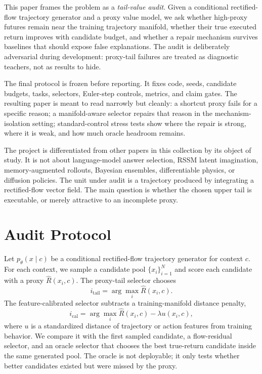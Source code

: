 \documentclass[10pt]{article}
\begin{document}
This paper frames the problem as a \emph{tail-value audit}. Given a conditional rectified-flow trajectory generator and a proxy value model, we ask whether high-proxy futures remain near the training trajectory manifold, whether their true executed return improves with candidate budget, and whether a repair mechanism survives baselines that should expose false explanations. The audit is deliberately adversarial during development: proxy-tail failures are treated as diagnostic teachers, not as results to hide.

The final protocol is frozen before reporting. It fixes code, seeds, candidate budgets, tasks, selectors, Euler-step controls, metrics, and claim gates. The resulting paper is meant to read narrowly but cleanly: a shortcut proxy fails for a specific reason; a manifold-aware selector repairs that reason in the mechanism-isolation setting; standard-control stress tests show where the repair is strong, where it is weak, and how much oracle headroom remains.

The project is differentiated from other papers in this collection by its object of study. It is not about language-model answer selection, RSSM latent imagination, memory-augmented rollouts, Bayesian ensembles, differentiable physics, or diffusion policies. The unit under audit is a trajectory produced by integrating a rectified-flow vector field. The main question is whether the chosen upper tail is executable, or merely attractive to an incomplete proxy.

\section{Audit Protocol}

Let \(p_\theta(x \mid c)\) be a conditional rectified-flow trajectory generator for context \(c\). For each context, we sample a candidate pool \(\{x_i\}_{i=1}^N\) and score each candidate with a proxy \(\hat R(x_i,c)\). The proxy-tail selector chooses
\[
i_{\mathrm{tail}} = \arg\max_i \hat R(x_i,c).
\]
The feature-calibrated selector subtracts a training-manifold distance penalty,
\[
i_{\mathrm{cal}} = \arg\max_i \hat R(x_i,c) - \lambda u(x_i,c),
\]
where \(u\) is a standardized distance of trajectory or action features from training behavior. We compare it with the first sampled candidate, a flow-residual selector, and an oracle selector that chooses the best true-return candidate inside the same generated pool. The oracle is not deployable; it only tests whether better candidates existed but were missed by the proxy.
\end{document}
